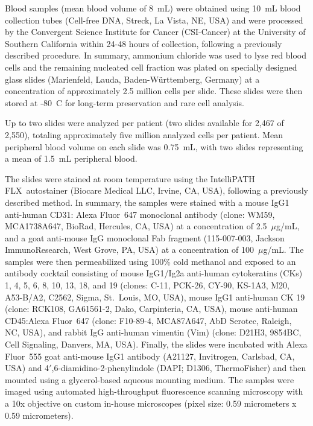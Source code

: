 \documentclass[11pt]{article}
\begin{document}
Blood samples (mean blood volume of 8~mL) were obtained using 10~mL blood collection tubes (Cell-free DNA, Streck, La Vista, NE, USA) and were processed by the Convergent Science Institute for Cancer (CSI-Cancer) at the University of Southern California within 24-48 hours of collection, following a previously described procedure\cite{marrinucci2012}. In summary, ammonium chloride was used to lyse red blood cells and the remaining nucleated cell fraction was plated on specially designed glass slides (Marienfeld, Lauda, Baden-W\"urttemberg, Germany) at a concentration of approximately 2.5 million cells per slide. These slides were then stored at -80~\textdegree C for long-term preservation and rare cell analysis.

Up to two slides were analyzed per patient (two slides available for 2,467 of 2,550), totaling approximately five million analyzed cells per patient. Mean peripheral blood volume on each slide was 0.75~mL, with two slides representing a mean of 1.5~mL peripheral blood.

The slides were stained at room temperature using the IntelliPATH FLX\texttrademark\ autostainer (Biocare Medical LLC, Irvine, CA, USA), following a previously described method\cite{chai2021}. In summary, the samples were stained with a mouse IgG1 anti-human CD31: Alexa Fluor\textregistered\ 647 monoclonal antibody (clone: WM59, MCA1738A647, BioRad, Hercules, CA, USA) at a concentration of 2.5~$\mu$g/mL, and a goat anti-mouse IgG monoclonal Fab fragment (115-007-003, Jackson ImmunoResearch, West Grove, PA, USA) at a concentration of 100~$\mu$g/mL. The samples were then permeabilized using 100\% cold methanol and exposed to an antibody cocktail consisting of mouse IgG1/Ig2a anti-human cytokeratins (CKs) 1, 4, 5, 6, 8, 10, 13, 18, and 19 (clones: C-11, PCK-26, CY-90, KS-1A3, M20, A53-B/A2, C2562, Sigma, St.~Louis, MO, USA), mouse IgG1 anti-human CK 19 (clone: RCK108, GA61561-2, Dako, Carpinteria, CA, USA), mouse anti-human CD45:Alexa Fluor\textregistered\ 647 (clone: F10-89-4, MCA87A647, AbD Serotec, Raleigh, NC, USA), and rabbit IgG anti-human vimentin (Vim) (clone: D21H3, 9854BC, Cell Signaling, Danvers, MA, USA). Finally, the slides were incubated with Alexa Fluor\textregistered\ 555 goat anti-mouse IgG1 antibody (A21127, Invitrogen, Carlsbad, CA, USA) and 4$'$,6-diamidino-2-phenylindole (DAPI; D1306, ThermoFisher) and then mounted using a glycerol-based aqueous mounting medium. The samples were imaged using automated high-throughput fluorescence scanning microscopy with a 10x objective on custom in-house microscopes (pixel size: 0.59 micrometers x 0.59 micrometers).
\end{document}

